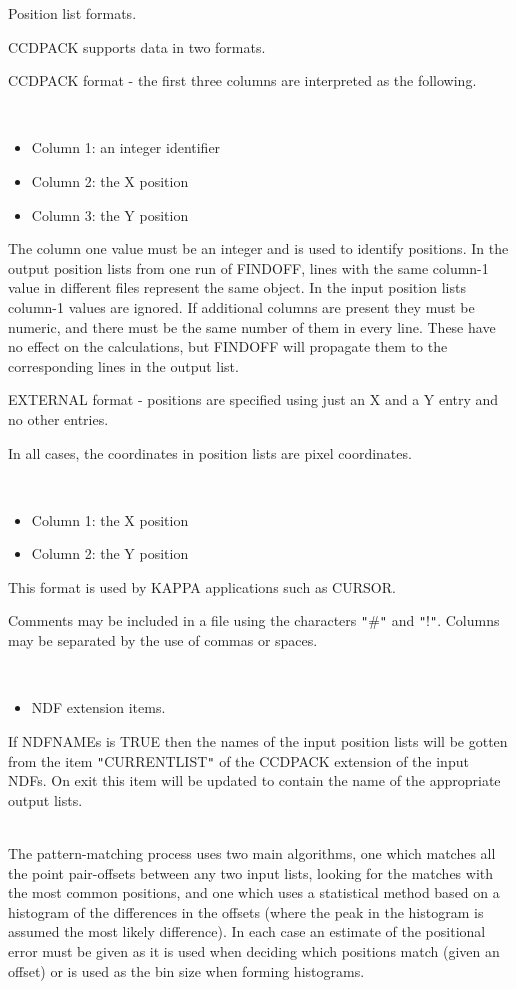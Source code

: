 \documentclass[twoside,11pt]{article}
\newcommand{\xref}[3]{#1}
\renewcommand{\_}{\texttt{\symbol{95}}}
\newcommand{\qt}[1]{{\tt "}#1{\tt "}}
\newcommand{\routine}[1]{{\sc #1}}
\newcommand{\sstdiytopic}[2]{\item[#1:] \mbox{} \\[1.3ex] #2}
\newcommand{\sstitemlist}[1]{
  \mbox{} \\
  \vspace{-3.5ex}
  \begin{itemize}
     #1
  \end{itemize}
}
\newcommand{\sstitem}{\item}
\newcommand{\sstdiytopic}[2]{\item[{#1}] #2 }
\newcommand{\sstitemlist}[1]{
      \begin{itemize}
         #1
      \end{itemize}
      \\
   }
\newcommand{\sstitem}{\item}
\begin{document}
{{{         \sstitem
         Position list formats.

      }
        CCDPACK supports data in two formats.

        CCDPACK format - the first three columns are interpreted as the
        following.

      \sstitemlist{

         \sstitem
              Column 1: an integer identifier

         \sstitem
              Column 2: the X position

         \sstitem
              Column 3: the Y position

      }
        The column one value must be an integer and is used to identify
        positions.  In the output position lists from one run of \routine{FINDOFF},
        lines with the same column-1 value in different files represent
        the same object.  In the input position lists column-1 values
        are ignored.  If additional columns are present they must be
        numeric, and there must be the same number of them in every 
        line.  These have no effect on the calculations, but \routine{FINDOFF}
        will propagate them to the corresponding lines in the output
        list.

        EXTERNAL format - positions are specified using just an X
        and a Y entry and no other entries.

        In all cases, the coordinates in position lists are pixel
        coordinates.

      \sstitemlist{

         \sstitem
              Column 1: the X position

         \sstitem
              Column 2: the Y position

      }
        This format is used by KAPPA applications such as
        \xref{CURSOR}{sun95}{CURSOR}.

        Comments may be included in a file using the characters \qt{\#} and
        \qt{!}. Columns may be separated by the use of commas or spaces.

      \sstitemlist{

         \sstitem
         NDF extension items.

      }
        If NDFNAMEs is TRUE then the names of the input position lists
        will be gotten from the item \qt{CURRENT\_LIST} of the CCDPACK
        extension of the input NDFs. On exit this item will be updated
        to contain the name of the appropriate output lists.
   }
   \sstdiytopic{
      Notes on Algorithms
   } {
      The pattern-matching process uses two main algorithms, one which
      matches all the point pair-offsets between any two input lists,
      looking for the matches with the most common positions, and one
      which uses a statistical method based on a histogram of the
      differences in the offsets (where the peak in the histogram is
      assumed the most likely difference). In each case an estimate of
      the positional error must be given as it is used when deciding
      which positions match (given an offset) or is used as the bin
      size when forming histograms.

}}
\end{document}
